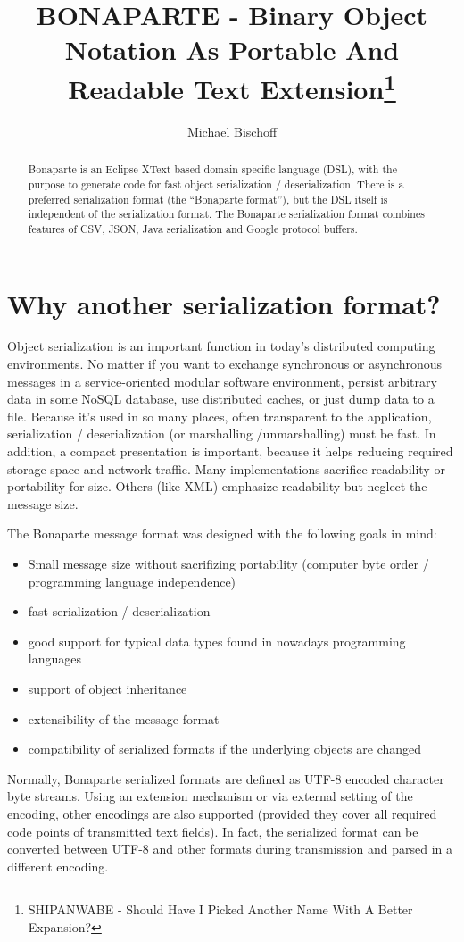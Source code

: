 \documentclass[11pt,a4paper,oneside]{article}
\title{BONAPARTE - Binary Object Notation As Portable And Readable Text
Extension\footnote{SHIPANWABE - Should Have I Picked Another Name With A Better Expansion?}
}
\author{Michael Bischoff}
\begin{document}
\maketitle
\begin{abstract}
Bonaparte is an Eclipse XText based domain specific language (DSL), with the purpose to generate code for fast object serialization / deserialization.
There is a preferred serialization format (the ``Bonaparte format''), but the DSL itself is independent of the serialization format.
The Bonaparte serialization format combines features of CSV, JSON, Java serialization and Google protocol buffers.
\end{abstract}
\section{Why another serialization format?}
Object serialization is an important function in today's distributed computing
environments. No matter if you want to exchange synchronous or asynchronous
messages in a service-oriented modular software environment, persist
arbitrary data in some NoSQL database, use distributed caches, or just dump data
to a file.
Because it's used in so many places, often transparent to the application,
serialization / deserialization (or marshalling /unmarshalling) must be fast. In
addition, a compact presentation is important, because it helps reducing
required storage space and network traffic.
Many implementations sacrifice readability or portability for size. Others (like XML)
emphasize readability but neglect the message size.

The Bonaparte message format was designed with the following goals in mind:
\begin{itemize}
  \item Small message size without sacrifizing portability (computer byte order
  / programming language independence)
  \item fast serialization / deserialization
  \item good support for typical data types found in nowadays programming
  languages
  \item support of object inheritance
  \item extensibility of the message format
  \item compatibility of serialized formats if the underlying objects are
  changed
\end{itemize}
Normally, Bonaparte serialized formats are defined as UTF-8 encoded character byte streams.
Using an extension mechanism or via external setting of the encoding, other encodings are also supported (provided they cover all required code points of transmitted text fields).
In fact, the serialized format can be converted between UTF-8 and other formats during transmission and parsed in a different encoding.
\end{document}

